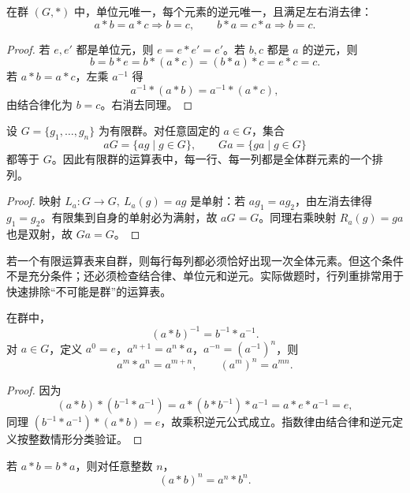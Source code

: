 \begin{theorem}[群中的唯一性与消去律]\label{group-basic-laws}
  在群 $(G,*)$ 中，单位元唯一，每个元素的逆元唯一，且满足左右消去律：
  \[
  a*b=a*c\Longrightarrow b=c,\qquad b*a=c*a\Longrightarrow b=c.
  \]
\end{theorem}

\begin{proof}
  若 $e,e'$ 都是单位元，则 $e=e*e'=e'$。若 $b,c$ 都是 $a$ 的逆元，则
  \[
  b=b*e=b*(a*c)=(b*a)*c=e*c=c.
  \]
  若 $a*b=a*c$，左乘 $a^{-1}$ 得
  \[
  a^{-1}*(a*b)=a^{-1}*(a*c),
  \]
  由结合律化为 $b=c$。右消去同理。
\end{proof}

\begin{theorem}[有限群运算表的行列重排性质]\label{group-table-latin}
  设 $G=\{g_1,\ldots,g_n\}$ 为有限群。对任意固定的 $a\in G$，集合
  \[
  aG=\{ag\mid g\in G\},\qquad Ga=\{ga\mid g\in G\}
  \]
  都等于 $G$。因此有限群的运算表中，每一行、每一列都是全体群元素的一个排列。
\end{theorem}

\begin{proof}
  映射 $L_a:G\to G,\ L_a(g)=ag$ 是单射：若 $ag_1=ag_2$，由左消去律得 $g_1=g_2$。有限集到自身的单射必为满射，故 $aG=G$。同理右乘映射 $R_a(g)=ga$ 也是双射，故 $Ga=G$。
\end{proof}

\begin{pitfall}[行列重排只是必要条件]\label{group-table-necessary}
  若一个有限运算表来自群，则每行每列都必须恰好出现一次全体元素。但这个条件不是充分条件；还必须检查结合律、单位元和逆元。实际做题时，行列重排常用于快速排除“不可能是群”的运算表。
\end{pitfall}

\begin{theorem}[乘积逆元与指数律]\label{inverse-power-laws}
  在群中，
  \[
  (a*b)^{-1}=b^{-1}*a^{-1}.
  \]
  对 $a\in G$，定义 $a^0=e$，$a^{n+1}=a^n*a$，$a^{-n}=(a^{-1})^n$，则
  \[
  a^m*a^n=a^{m+n},\qquad (a^m)^n=a^{mn}.
  \]
\end{theorem}

\begin{proof}
  因为
  \[
  (a*b)*(b^{-1}*a^{-1})=a*(b*b^{-1})*a^{-1}=a*e*a^{-1}=e,
  \]
  同理 $(b^{-1}*a^{-1})*(a*b)=e$，故乘积逆元公式成立。指数律由结合律和逆元定义按整数情形分类验证。
\end{proof}

\begin{theorem}[可交换元素的幂]\label{commuting-power}
  若 $a*b=b*a$，则对任意整数 $n$，
  \[
  (a*b)^n=a^n*b^n.
  \]
\end{theorem}

